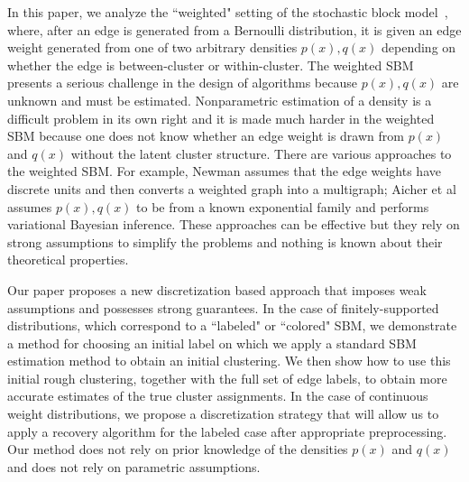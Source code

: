 In this paper, we analyze the ``weighted" setting of the stochastic block model~\cite{aicher2014learning}, where, after an edge is generated from a Bernoulli distribution, it is given an edge weight generated from one of two arbitrary densities $p(x), q(x)$ depending on whether the edge is between-cluster or within-cluster. The weighted SBM presents a serious challenge in the design of algorithms because $p(x), q(x)$ are unknown and must be estimated. Nonparametric estimation of a density is a difficult problem in its own right and it is made much harder in the weighted SBM because one does not know whether an edge weight is drawn from $p(x)$ and $q(x)$ without the latent cluster structure. There are various approaches to the weighted SBM. For example, Newman \cite{New04} assumes that the edge weights have discrete units and then converts a weighted graph into a multigraph; Aicher et al \cite{aicher2014learning} assumes $p(x), q(x)$ to be from a known exponential family and performs variational Bayesian inference. These approaches can be effective but they rely on strong assumptions to simplify the problems and nothing is known about their theoretical properties. 

Our paper proposes a new discretization based approach that imposes weak assumptions and possesses strong guarantees. In the case of finitely-supported distributions, which correspond to a ``labeled" or ``colored" SBM, we demonstrate a method for choosing an initial label on which we apply a standard SBM estimation method to obtain an initial clustering. We then show how to use this initial rough clustering, together with the full set of edge labels, to obtain more accurate estimates of the true cluster assignments. In the case of continuous weight distributions, we propose a discretization strategy that will allow us to apply a recovery algorithm for the labeled case after appropriate preprocessing. Our method does not rely on prior knowledge of the densities $p(x)$ and $q(x)$ and does not rely on parametric assumptions.

